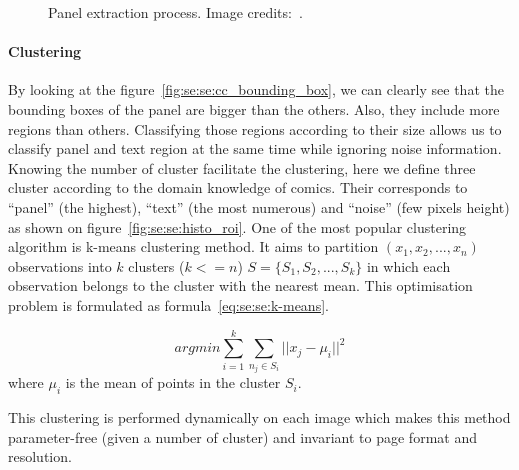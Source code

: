 \begin{figure}
		  \caption{Panel extraction process. Image credits:~\cite{Bubble09}.}
	\end{figure}




\paragraph{Clustering} %
\label{par:clustering}
By looking at the figure~\ref{fig:se:se:cc_bounding_box}, we can clearly see that the bounding boxes of the panel are bigger than the others.
Also, they include more regions than others.
Classifying those regions according to their size allows us to classify panel and text region at the same time while ignoring noise information.
Knowing the number of cluster facilitate the clustering, here 
we define three cluster according to the domain knowledge of comics.
Their corresponds to ``panel'' (the highest), ``text'' (the most numerous) and ``noise'' (few pixels height) as shown on figure~\ref{fig:se:se:histo_roi}.
One of the most popular clustering algorithm is k-means clustering method.
It aims to partition $(x_1, x_2, ...,x_n)$ observations into $k$ clusters ($k <= n$) $S=\{S_1, S_2, ..., S_k\}$ in which each observation belongs to the cluster with the nearest mean.
This optimisation problem is formulated as formula~\ref{eq:se:se:k-means}.

\begin{equation}
	arg min \sum\limits_{i=1}^k \sum\limits_{n_j \in S_i} ||x_j - \mu_i||^2
	\label{eq:se:se:k-means}
\end{equation}
where $\mu_i$ is the mean of points in the cluster $S_i$.

This clustering is performed dynamically on each image which makes this method parameter-free (given a number of cluster) and invariant to page format and resolution.

